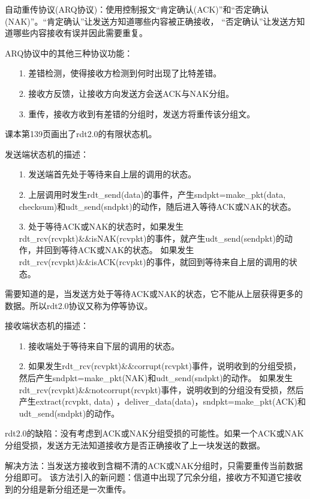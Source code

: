 \documentclass[a4paper,left=2.5cm,right=2.5cm,11pt]{article}
\begin{document}
	自动重传协议(ARQ协议)：使用控制报文“肯定确认(ACK)”和“否定确认(NAK)”。“肯定确认”让发送方知道哪些内容被正确接收，
	“否定确认”让发送方知道哪些内容接收有误并因此需要重复。\par

	ARQ协议中的其他三种协议功能：
	\begin{itemize}
		\item[1.] 差错检测，使得接收方检测到何时出现了比特差错。
		\item[2.] 接收方反馈，让接收方向发送方会送ACK与NAK分组。
		\item[3.] 重传，接收方收到有差错的分组时，发送方将重传该分组文。
	\end{itemize}

	课本第139页画出了rdt2.0的有限状态机。\par

	发送端状态机的描述：
	\begin{itemize}
		\item[1.] 发送端首先处于等待来自上层的调用的状态。
		\item[2.] 上层调用时发生rdt\_send(data)的事件，产生sndpkt=make\_pkt(data, checksum)和udt\_send(sndpkt)的动作，随后进入等待ACK或NAK的状态。
		\item[3.] 处于等待ACK或NAK的状态时，如果发生rdt\_rcv(rcvpkt)\&\&isNAK(rcvpkt)的事件，就产生udt\_send(sendpkt)的动作，并回到等待ACK或NAK的状态。
				  如果发生rdt\_rcv(rcvpkt)\&\&isACK(rcvpkt)的事件，就回到等待来自上层的调用的状态。
	\end{itemize}

	需要知道的是，当发送方处于等待ACK或NAK的状态，它不能从上层获得更多的数据。所以rdt2.0协议又称为停等协议。\par

	接收端状态机的描述：
	\begin{itemize}
		\item[1.] 接收端处于等待来自下层的调用的状态。
		\item[2.] 如果发生rdt\_rcv(rcvpkt)\&\&corrupt(rcvpkt)事件，说明收到的分组受损，然后产生sndpkt=make\_pkt(NAK)和udt\_send(sndpkt)的动作。
				  如果发生rdt\_rcv(rcvpkt)\&\&notcorrupt(rcvpkt)事件，说明收到的分组没有受损，然后产生extract(rcvpkt, data)
				  ，deliver\_data(data)，sndpkt=make\_pkt(ACK)和udt\_send(sndpkt)的动作。
	\end{itemize}

	rdt2.0的缺陷：没有考虑到ACK或NAK分组受损的可能性。如果一个ACK或NAK分组受损，发送方无法知道接收方是否正确接收了上一块发送的数据。\par
	解决方法：当发送方接收到含糊不清的ACK或NAK分组时，只需要重传当前数据分组即可。
	该方法引入的新问题：信道中出现了冗余分组，接收方不知道它接收到的分组是新分组还是一次重传。\par
\end{document}
